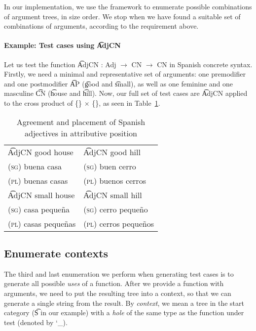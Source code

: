 In our implementation, we use the \feat{} framework \cite{feat} to
enumerate possible combinations of argument trees, in size order. We
stop when we have found a suitable set of combinations of arguments,
according to the requirement above. 

\paragraph{Example: Test cases using \t{AdjCN}} Let us test the function
\t{AdjCN : Adj $\rightarrow$ CN $\rightarrow$ CN} in Spanish
concrete syntax. 
Firstly, we need a minimal and representative set of arguments:
one premodifier and one postmodifier \t{AP} (\t{good} and
\t{small}), as well as one feminine and one masculine
\t{CN} (\t{house} and \t{hill}). Now, our full set of test cases are
\t{AdjCN} applied to the cross product of \{\} $\times$ \{\}, as seen in Table~\ref{tab:adjAttr}.

\begin{table}[h]
\centering
\begin{tabular}{| l | l |}
\hline
\t{AdjCN good house}   & \t{AdjCN good hill} \\
\textsc{(sg)} buena casa            & \textsc{(sg)} buen cerro \\
\textsc{(pl)} buenas casas          & \textsc{(pl)} buenos cerros \\ \hline

\t{AdjCN small house}   & \t{AdjCN small hill} \\

\textsc{(sg)} casa peque\~{n}a            & \textsc{(sg)} cerro peque\~{n}o \\
\textsc{(pl)} casas peque\~{n}as          & \textsc{(pl)} cerros peque\~{n}os \\ \hline
\end{tabular}
\caption{Agreement and placement of Spanish adjectives in attributive position}
\label{tab:adjAttr}
\end{table}

\subsection{Enumerate contexts} The third and last enumeration we
perform when generating test cases is to generate all possible
\emph{uses} of a function. After we provide a function with arguments,
we need to put the resulting tree into a context, so that we can generate a
single string from the result. By \emph{context}, we mean a tree in
the start category (\t{S} in our example) with a \emph{hole} of the
same type as the function under test (denoted by \char`_).

